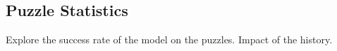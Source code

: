 \subsection{Puzzle Statistics}
Explore the success rate of the model on the puzzles.
Impact of the history.
